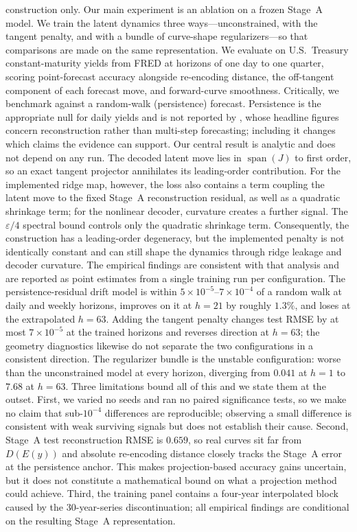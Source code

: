 \documentclass{article} %
\begin{document}
construction only.
Our main experiment is an ablation on a frozen Stage~A model. We train the latent
dynamics three ways---unconstrained, with the tangent penalty, and with a bundle of
curve-shape regularizers---so that comparisons are made on the same representation.
We evaluate on U.S.\ Treasury constant-maturity yields from FRED at horizons of one
day to one quarter, scoring point-forecast accuracy alongside re-encoding distance,
the off-tangent component of each forecast move, and forward-curve smoothness.
Critically, we benchmark against a random-walk (persistence) forecast. Persistence
is the appropriate null for daily yields and is not reported by
\citet{NoArbVAEYieldCurves}, whose headline figures concern reconstruction rather
than multi-step forecasting; including it changes which claims the evidence can
support.
Our central result is analytic and does not depend on any run. The decoded latent
move lies in $\operatorname{span}(J)$ to first order, so an exact tangent projector
annihilates its leading-order contribution. For the implemented ridge map, however,
the loss also contains a term coupling the latent move to the fixed Stage~A
reconstruction residual, as well as a quadratic shrinkage term; for the nonlinear
decoder, curvature creates a further signal. The $\varepsilon/4$ spectral bound
controls only the quadratic shrinkage term. Consequently, the construction has a
leading-order degeneracy, but the implemented penalty is not identically constant
and can still shape the dynamics through ridge leakage and decoder curvature.
The empirical findings are consistent with that analysis and are reported as point
estimates from a single training run per configuration. The persistence-residual
drift model is within $5\times10^{-5}$--$7\times10^{-4}$ of a random walk at daily
and weekly horizons, improves on it at $h{=}21$ by roughly $1.3\%$, and loses at the
extrapolated $h{=}63$. Adding the tangent penalty changes test RMSE by at most
$7\times10^{-5}$ at the trained horizons and reverses direction at $h{=}63$; the
geometry diagnostics likewise do not separate the two configurations in a consistent
direction. The regularizer bundle is the unstable configuration: worse than the
unconstrained model at every horizon, diverging from $0.041$ at $h{=}1$ to $7.68$ at
$h{=}63$.
Three limitations bound all of this and we state them at the outset. First, we varied
no seeds and ran no paired significance tests, so we make no claim that
sub-$10^{-4}$ differences are reproducible; observing a small difference is
consistent with weak surviving signals but does not establish their cause. Second,
Stage~A test reconstruction RMSE is $0.659$, so real curves sit far from
$D(E(y))$ and absolute re-encoding distance closely tracks the Stage~A error at the
persistence anchor. This makes projection-based accuracy gains uncertain, but it
does not constitute a mathematical bound on what a projection method could achieve.
Third, the training panel contains a four-year interpolated block caused by the
30-year-series discontinuation; all empirical findings are conditional on the
resulting Stage~A representation.
\end{document}
